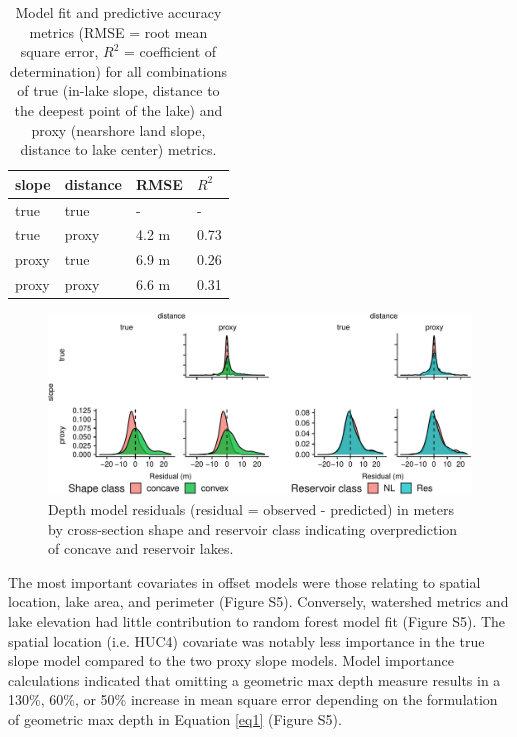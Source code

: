 \documentclass[draft]{agujournal2019}
\begin{document}
\begin{table}[h]
  \caption{Model fit and predictive accuracy metrics (RMSE = root mean square error, $R^2$ = coefficient of determination) for all combinations of true (in-lake slope, distance to the deepest point of the lake) and proxy (nearshore land slope, distance to lake center) metrics.} \label{table2}
  \centering
\begin{tabular}{llll}
  \hline
  slope & distance & RMSE & $R^2$\\
  \hline
  true & true & - & -\\
  true & proxy & 4.2 m & 0.73\\
  proxy & true & 6.9 m & 0.26\\
  proxy & proxy & 6.6 m & 0.31\\
  \hline
\end{tabular}
\end{table}

\begin{figure}
  \begin{center}
    \includegraphics[width=\textwidth,keepaspectratio]{../figures/02_depth_model_grid_resid-1}
  \end{center}
  \caption{Depth model residuals (residual  = observed - predicted) in meters by cross-section shape and reservoir class indicating overprediction of concave and reservoir lakes.}\label{fig4}
\end{figure}

The most important covariates in offset models were those relating to spatial location, lake area, and perimeter (Figure S5). Conversely, watershed metrics and lake elevation had little contribution to random forest model fit (Figure S5). The spatial location (i.e. HUC4) covariate was notably less importance in the true slope model compared to the two proxy slope models. Model importance calculations indicated that omitting a geometric max depth measure results in a 130\%, 60\%, or 50\% increase in mean square error depending on the formulation of geometric max depth in Equation \ref{eq1} (Figure S5).
\end{document}
